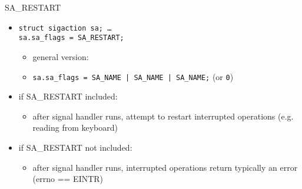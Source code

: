 
\begin{frame}{SA\_RESTART}
    \begin{itemize}
    \item \texttt{struct sigaction sa; \ldots} \\\texttt{sa.sa\_flags = SA\_RESTART;}
        \begin{itemize}
        \item general version:
        \item \texttt{sa.sa\_flags = SA\_NAME | SA\_NAME | SA\_NAME;} (or \texttt{0})
        \end{itemize}
    \item if SA\_RESTART included:
        \begin{itemize}
        \item after signal handler runs, attempt to restart interrupted operations
                (e.g. reading from keyboard)
        \end{itemize}
    \item if SA\_RESTART not included:
        \begin{itemize}
        \item after signal handler runs, interrupted operations return
            typically an error (errno == EINTR)
        \end{itemize}
    \end{itemize}
\end{frame}
